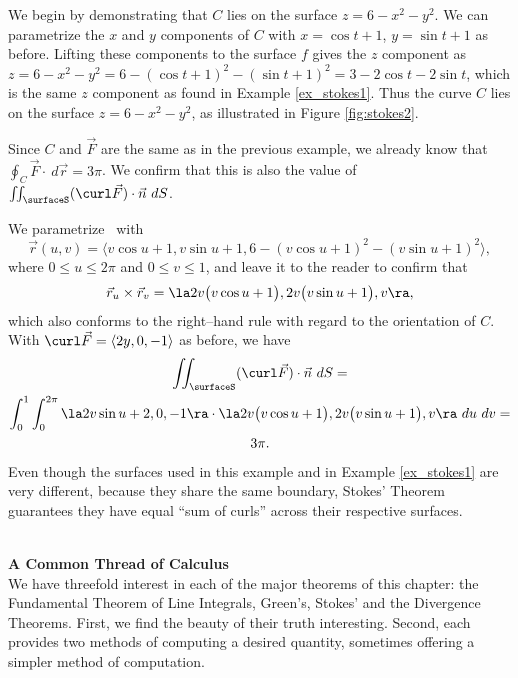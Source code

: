 {We begin by demonstrating that $C$ lies on the surface $z=6-x^2-y^2$. We can parametrize the $x$ and $y$ components of $C$ with $x=\cos t+1$, $y=\sin t+1$ as before. Lifting these components to the surface $f$ gives the $z$ component as $z = 6-x^2-y^2 = 6-(\cos t+1)^2-(\sin t+1)^2 = 3-2\cos t-2\sin t$, which is the same $z$ component as found in Example \ref{ex_stokes1}. Thus the curve $C$ lies on the surface $z=6-x^2-y^2$, as illustrated in Figure \ref{fig:stokes2}. 


Since $C$ and $\vec F$ are the same as in the previous example, we already know that $\oint_C\vec F\cdot\ d\vec r = 3\pi$. We confirm that this is also the value of $\iint_\surfaceS (\curl\vec F)\cdot \vec n\ dS $.

We parametrize \surfaceS\ with $$\vec r(u,v) = \langle v\cos u+1,v\sin u+1, 6-(v\cos u+1)^2-(v\sin u+1)^2\rangle,$$
where $0\leq u\leq 2\pi$ and $0\leq v\leq 1$, and leave it to the reader to confirm that
$$\vec r_u\times \vec r_v = \la 2v\big(v\cos u+1\big), 2v\big(v\sin u+1\big),v\ra,$$
which also conforms to the right--hand rule with regard to the orientation of $C$. With $\curl \vec F = \langle 2y,0,-1\rangle$ as before, we have
\begin{multline*}
\iint_\surfaceS (\curl\vec F)\cdot \vec n\ dS = \\ 
\int_0^1\int_0^{2\pi} \la 2v\sin u+2,0,-1\ra\cdot \la 2v\big(v\cos u+1\big), 2v\big(v\sin u+1\big),v\ra\ du\ dv =\\
3\pi.
\end{multline*}
Even though the  surfaces used in this example and in Example \ref{ex_stokes1} are very different, because they share the same boundary, Stokes' Theorem guarantees they have equal ``sum of curls'' across their respective surfaces.
}\\

\clearpage
\noindent\textbf{\large A Common Thread of Calculus}\\

We have threefold interest in each of the major theorems of this chapter: the Fundamental Theorem of Line Integrals, Green's, Stokes' and the Divergence Theorems. First, we find the beauty of their truth interesting. Second, each provides two methods of computing a desired quantity, sometimes offering a simpler method of computation. 

